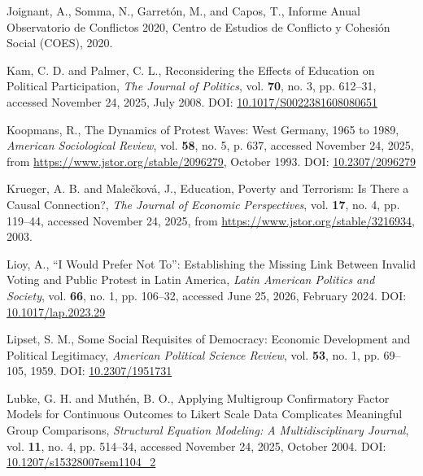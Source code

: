 \documentclass[
  13pt,
]{article}
\newlength{\cslhangindent}
\newenvironment{CSLReferences}[2] %
 {\begin{list}{}{%
  \setlength{\itemindent}{0pt}
  \setlength{\leftmargin}{0pt}
  \setlength{\parsep}{0pt}
  \ifodd #1
   \setlength{\leftmargin}{\cslhangindent}
   \setlength{\itemindent}{-1\cslhangindent}
  \fi
  \setlength{\itemsep}{#2\baselineskip}}}
 {\end{list}}
\begin{document}
\begin{CSLReferences}{1}{0}
Joignant, A., Somma, N., Garretón, M., and Capos, T., Informe {Anual
Observatorio} de {Conflictos} 2020, Centro de Estudios de Conflicto y
Cohesión Social (COES), 2020.

Kam, C. D. and Palmer, C. L., Reconsidering the {Effects} of {Education}
on {Political Participation}, \emph{The Journal of Politics}, vol.
\textbf{70}, no. 3, pp. 612--31, accessed November 24, 2025, July 2008.
DOI:
\href{https://doi.org/10.1017/S0022381608080651}{10.1017/S0022381608080651}

Koopmans, R., The {Dynamics} of {Protest Waves}: {West Germany}, 1965 to
1989, \emph{American Sociological Review}, vol. \textbf{58}, no. 5, p.
637, accessed November 24, 2025, from
\url{https://www.jstor.org/stable/2096279}, October 1993. DOI:
\href{https://doi.org/10.2307/2096279}{10.2307/2096279}

Krueger, A. B. and Malečková, J., Education, {Poverty} and {Terrorism}:
{Is There} a {Causal Connection}?, \emph{The Journal of Economic
Perspectives}, vol. \textbf{17}, no. 4, pp. 119--44, accessed November
24, 2025, from \url{https://www.jstor.org/stable/3216934}, 2003.

Lioy, A., {``{I Would Prefer Not To}''}: {Establishing} the {Missing
Link} Between {Invalid Voting} and {Public Protest} in {Latin America},
\emph{Latin American Politics and Society}, vol. \textbf{66}, no. 1, pp.
106--32, accessed June 25, 2026, February 2024. DOI:
\href{https://doi.org/10.1017/lap.2023.29}{10.1017/lap.2023.29}

Lipset, S. M., Some {Social Requisites} of {Democracy}: {Economic
Development} and {Political Legitimacy}, \emph{American Political
Science Review}, vol. \textbf{53}, no. 1, pp. 69--105, 1959. DOI:
\href{https://doi.org/10.2307/1951731}{10.2307/1951731}

Lubke, G. H. and Muthén, B. O., Applying {Multigroup Confirmatory Factor
Models} for {Continuous Outcomes} to {Likert Scale Data Complicates
Meaningful Group Comparisons}, \emph{Structural Equation Modeling: A
Multidisciplinary Journal}, vol. \textbf{11}, no. 4, pp. 514--34,
accessed November 24, 2025, October 2004. DOI:
\href{https://doi.org/10.1207/s15328007sem1104_2}{10.1207/s15328007sem1104\_2}


\end{CSLReferences}
\end{document}
